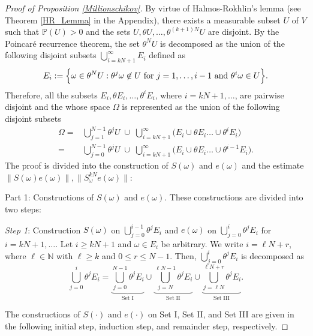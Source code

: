 \documentclass[pdflatex,sn-mathphys-num]{sn-jnl}%
\theoremstyle{thmstyleone}%
\theoremstyle{thmstyletwo}%
\theoremstyle{thmstylethree}%
\newcommand{\N}{\mathbb{N}}
\newcommand{\mP}{\mathbb{P}}
\numberwithin{equation}{section}
\begin{document}
\begin{proof}[Proof of Proposition \ref{Millionschikov}]
By virtue of Halmos-Rokhlin's lemma (see Theorem \ref{HR_Lemma} in the Appendix), there exists a measurable subset $U$ of $V$ such that  $\mP(U)>0$ and the sets $U,\theta U,\dots,\theta^{(k+1)N}U$ are disjoint. By the Poincar\'{e} recurrence theorem, the set $\theta^NU$ is decomposed as the union of the following disjoint subsets $\bigcup_{i={kN+1}}^{\infty} E_i$ defined as 
\begin{equation*}\label{DecomposeofU}
E_i:=\Big\{\omega\in\theta^N U: \theta^j\omega\not\in U \hbox{ for } j=1,\dots,i-1 \hbox{ and } \theta^i\omega\in U \Big\}.    
\end{equation*}
Therefore, all the subsets $E_i,\theta E_i,\dots,\theta^i E_i$, where $i=kN+1,\dots$, are pairwise disjoint and the whose space $\Omega$ is represented as the union of the following disjoint subsets 
\begin{align}
\Omega
=&  \bigcup_{j=1}^{N-1}\theta^j U\;\cup\; \bigcup_{i=kN+1}^{\infty}  \Big(E_i\cup \theta E_i\dots\cup\theta^i E_i\Big)\label{PresentationOmega_I}\\
=&
 \bigcup_{j=0}^{N-1}\theta^j U\;\cup\; \bigcup_{i=kN+1}^{\infty}  \Big(E_i\cup \theta E_i\dots\cup\theta^{i-1} E_i\Big).\label{PresentationOmega_II}
\end{align}
The proof is divided into the construction of 
$S(\omega)$ and $e(\omega)$ and the estimate $\|S(\omega)e(\omega)\|, \|S^{kN}_{\omega}e(\omega)\|$:

Part 1: Constructions of $S(\omega)$ and $e(\omega)$. These constructions are divided into two steps:

\emph{Step 1}: Construction $S(\omega)$ on $\bigcup_{j=0}^{i-1} \theta^j E_i$ and $e(\omega)$ on $\bigcup_{j=0}^i \theta^j E_i$ for $i=kN+1,\dots$. Let $i\geq kN+1$ and $\omega\in E_i$ be arbitrary.  We write $i=\ell N+r$, where $\ell\in\N$ with $\ell\geq k$ and $0\leq r\leq N-1$. Then, $\bigcup_{j=0}^i \theta^j E_i$ is decomposed as 
\[
\bigcup_{j=0}^i \theta^j E_i
=
\underbrace{\bigcup_{j=0}^{N-1} \theta^j E_i}_{\mathrm{Set\; I}}
\cup 
\underbrace{\bigcup_{j=N}^{\ell N-1} \theta^j E_i}_{\mathrm{Set\; II}}
\cup 
\underbrace{\bigcup_{j=\ell N}^{\ell N+r} \theta^j E_i}_{\mathrm{Set\; III}}.
\]


The constructions of $S(\cdot)$ and $e(\cdot)$ on Set I, Set II, and Set III are given in the following initial step, induction step, and remainder step, respectively.


\end{proof}
\end{document}
